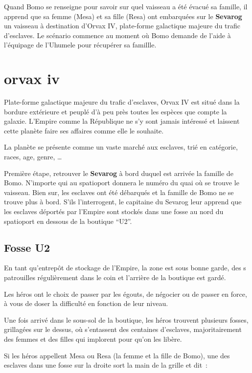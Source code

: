 \documentclass{jdrp}
\begin{document}
	Quand Bomo se renseigne pour savoir sur quel vaisseau a été évacué sa famille, il apprend que sa femme (Mesa) et sa fille (Resa) ont embarquées sur le \textbf{Sevarog} un vaisseau à destination d’Orvax IV, plate-forme galactique majeure du trafic d’esclaves. Le scénario commence au moment où Bomo demande de l’aide à l’équipage de l’Uhumele pour récupérer sa famillle.

	\section{orvax iv}
	Plate-forme galactique majeure du trafic d’esclaves, Orvax IV est situé dans la bordure extérieure et peuplé d’à peu près toutes les espèces que compte la galaxie. L’Empire comme la République ne s’y sont jamais intéressé et laissent cette planète faire ses affaires comme elle le souhaite.

	La planète se présente comme un vaste marché aux esclaves, trié en catégorie, races, age, genre, \ldots

	Première étape, retrouver le \textbf{Sevarog} à bord duquel est arrivée la famille de Bomo. N’importe qui au spatioport donnera le numéro du quai où se trouve le vaisseau. Bien sur, les esclaves ont été débarqués et la famille de Bomo ne se trouve plus à bord. S’ils l’interrogent, le capitaine du Sevarog leur apprend que les esclaves déportés par l’Empire sont stockés dans une fosse au nord du spatioport en dessous de la boutique “U2”.

	\subsection{Fosse U2}
	En tant qu’entrepôt de stockage de l’Empire, la zone est sous bonne garde, des s patrouilles régulièrement dans le coin et l’arrière de la boutique est gardé.

	Les héros ont le choix de passer par les égouts, de négocier ou de passer en force, à vous de doser la difficulté en fonction de leur niveau.

	Une fois arrivé dans le sous-sol de la boutique, les héros trouvent plusieurs fosses, grillagées sur le dessus, où s’entassent des centaines d’esclaves, majoritairement des femmes et des filles qui implorent pour qu’on les libère.

	Si les héros appellent Mesa ou Resa (la femme et la fille de Bomo), une des esclaves dans une fosse sur la droite sort la main de la grille et dit~:
\end{document}
